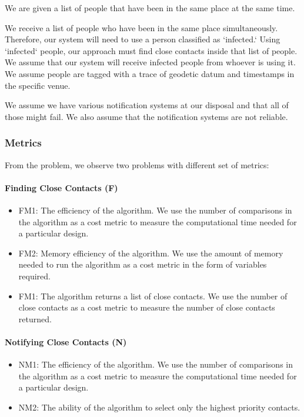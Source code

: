 \documentclass{article}
\begin{document}
We are given a list of people that have been in the same place at the same time. 

We receive a list of people who have been in the same place simultaneously. Therefore, our system will need to use a person classified as `infected.` Using `infected` people, our approach must find close contacts inside that list of people. We assume that our system will receive infected people from whoever is using it. We assume people are tagged with a trace of geodetic datum and timestamps in the specific venue.

We assume we have various notification systems at our disposal and that all of those might fail. We also assume that the notification systems are not reliable. 

\subsubsection{Metrics}

From the problem, we observe two problems with different set of metrics:

\paragraph{Finding Close Contacts (F)}

\begin{itemize}
  \item FM1: The efficiency of the algorithm. We use the number of comparisons in the algorithm as a cost metric to measure the computational time needed for a particular design.
  \item FM2: Memory efficiency of the algorithm. We use the amount of memory needed to run the algorithm as a cost metric in the form of variables required. 
  \item FM1: The algorithm returns a list of close contacts. We use the number of close contacts as a cost metric to measure the number of close contacts returned.
\end{itemize}

\paragraph{Notifying Close Contacts (N)}

\begin{itemize}
  \item NM1: The efficiency of the algorithm. We use the number of comparisons in the algorithm as a cost metric to measure the computational time needed for a particular design. 
  \item NM2: The ability of the algorithm to select only the highest priority contacts.
\end{itemize}
\end{document}
